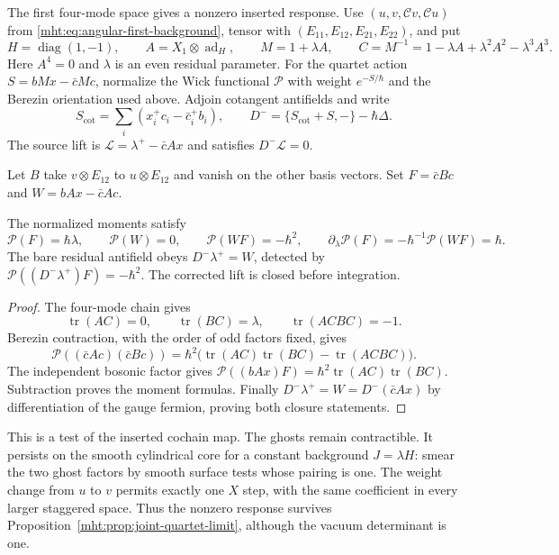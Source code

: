 The first four-mode space gives a nonzero inserted response.
Use $(u,v,\mathcal Cv,\mathcal Cu)$ from
\eqref{mht:eq:angular-first-background}, tensor with
$(E_{11},E_{12},E_{21},E_{22})$, and put
\[
 H=\operatorname{diag}(1,-1),\qquad
 A=X_1\otimes\operatorname{ad}_H,\qquad
 M=1+\lambda A,\qquad
 C=M^{-1}=1-\lambda A+\lambda^2A^2-\lambda^3A^3.
\]
Here $A^4=0$ and $\lambda$ is an even residual parameter.
For the quartet action $S=bMx-\bar cMc$, normalize the Wick
functional $\mathcal P$ with weight $e^{-S/\hbar}$ and the
Berezin orientation used above. Adjoin cotangent antifields and
write
\[
 S_{\mathrm{cot}}=\sum_i(x_i^+c_i-\bar c_i^+b_i),\qquad
 D^- =\{S_{\mathrm{cot}}+S,-\}-\hbar\Delta.
\]
The source lift is
$\mathcal L=\lambda^+-\bar cAx$ and satisfies $D^-\mathcal L=0$.

Let $B$ take $v\otimes E_{12}$ to $u\otimes E_{12}$ and vanish
on the other basis vectors. Set $F=\bar cBc$ and
$W=bAx-\bar cAc$.

\begin{proposition}\label{mht:prop:inserted-source-detector}
The normalized moments satisfy
\begin{equation}\label{mht:eq:inserted-source-detector}
 \mathcal P(F)=\hbar\lambda,\qquad
 \mathcal P(W)=0,\qquad
 \mathcal P(WF)=-\hbar^2,\qquad
 \partial_\lambda\mathcal P(F)
       =-\hbar^{-1}\mathcal P(WF)=\hbar.
\end{equation}
The bare residual antifield obeys $D^-\lambda^+=W$, detected by
$\mathcal P((D^-\lambda^+)F)=-\hbar^2$. The corrected lift is
closed before integration.
\end{proposition}

\begin{proof}
The four-mode chain gives
\[
 \operatorname{tr}(AC)=0,\qquad
 \operatorname{tr}(BC)=\lambda,\qquad
 \operatorname{tr}(ACBC)=-1.
\]
Berezin contraction, with the order of odd factors fixed, gives
\[
 \mathcal P((\bar cAc)(\bar cBc))
   =\hbar^2\bigl(\operatorname{tr}(AC)\operatorname{tr}(BC)
                         -\operatorname{tr}(ACBC)\bigr).
\]
The independent bosonic factor gives
$\mathcal P((bAx)F)=\hbar^2\operatorname{tr}(AC)
\operatorname{tr}(BC)$. Subtraction proves the moment formulas.
Finally $D^-\lambda^+=W=D^-(\bar cAx)$ by differentiation of
the gauge fermion, proving both closure statements.
\end{proof}

This is a test of the inserted cochain map. The ghosts remain
contractible. It persists on the smooth cylindrical core for a
constant background $J=\lambda H$: smear the two ghost factors
by smooth surface tests whose pairing is one. The weight change
from $u$ to $v$ permits exactly one $X$ step, with the same
coefficient in every larger staggered space. Thus the nonzero
response survives Proposition~\ref{mht:prop:joint-quartet-limit},
although the vacuum determinant is one.

